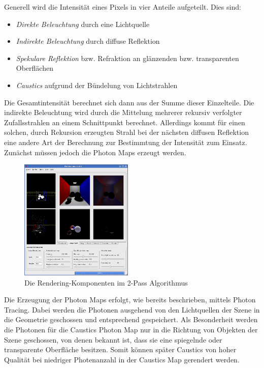 \documentclass[a4paper,twocolumn,abstracton]{scrartcl}
\begin{document}
Generell wird die Intensität eines Pixels in vier Anteile aufgeteilt. Dies sind:
\begin{itemize}
 \item \emph{Direkte Beleuchtung} durch eine Lichtquelle
 \item \emph{Indirekte Beleuchtung} durch diffuse Reflektion
 \item \emph{Spekulare Reflektion} bzw. Refraktion an glänzenden bzw. transparenten Oberflächen
 \item \emph{Caustics} aufgrund der Bündelung von Lichtstrahlen
\end{itemize}
Die Gesamtintensität berechnet sich dann aus der Summe dieser Einzelteile. Die indirekte Beleuchtung wird durch die Mittelung mehrerer rekursiv verfolgter Zufallsstrahlen an einem Schnittpunkt berechnet. Allerdings kommt für einen solchen, durch Rekursion erzeugten Strahl bei der nächsten diffusen Reflektion eine andere Art der Berechnung zur Bestimmtung der Intensität zum Einsatz. Zunächst müssen jedoch die Photon Maps erzeugt werden.

\begin{figure}[htb]
\centering
\includegraphics[width=0.48\textwidth]{img/components}
\caption{Die Rendering-Komponenten im 2-Pass Algorithmus}
\label{fig:components}
\end{figure}

Die Erzeugung der Photon Maps erfolgt, wie bereits beschrieben, mittels Photon Tracing. Dabei werden die Photonen ausgehend von den Lichtquellen der Szene in die Geometrie geschossen und entsprechend gespeichert. Als Besonderheit werden die Photonen für die Caustics Photon Map nur in die Richtung von Objekten der Szene geschossen, von denen bekannt ist, dass sie eine spiegelnde oder transparente Oberfläche besitzen. Somit können später Caustics von hoher Qualität bei niedriger Photenanzahl in der Caustics Map gerendert werden.
\end{document}
